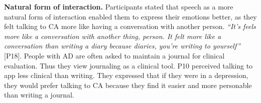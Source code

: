         
        
        
        
        
        \textbf{Natural form of interaction. }
        Participants stated that speech as a more natural form of interaction enabled them to express their emotions better, as they felt talking to \ac{CA} more like having a conversation with another person.
                \textit{
                ``It's feels more like a conversation with another thing, person. It felt more like a conversation than writing a diary because diaries, you're writing to yourself''
                }
                [P18].
        People with \ac{AD} are often asked to maintain a journal for clinical evaluation. Thus they view journaling as a clinical tool. 
        P10 perceived talking to \acl{app} less clinical than writing. They expressed that if they were in a depression, they would prefer talking to \ac{CA} because they find it easier and more personable than writing a journal.
